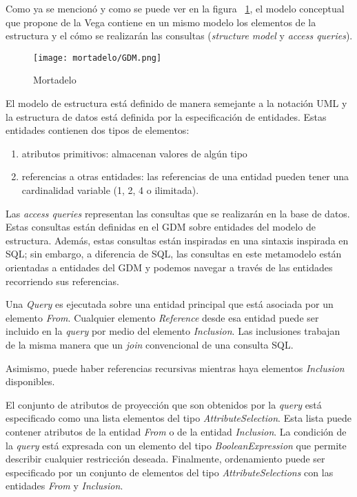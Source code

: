 Como ya se mencionó y como se puede ver en la figura ~\ref{img:mortadelo-gdm}, el modelo conceptual que propone de la Vega contiene en un mismo modelo los elementos de la estructura y el cómo se realizarán las consultas (\textit{structure model} y \textit{access queries}).


\begin{figure}[h!t] 
    \centering
    \texttt{[image: mortadelo/GDM.png]}
    \caption{Mortadelo}
    \label{img:mortadelo-gdm}
\end{figure}

El modelo de estructura está definido de manera semejante a la notación UML y la estructura de datos está definida por la especificación de entidades. Estas entidades contienen dos tipos de elementos:

\begin{enumerate}
    \item atributos primitivos: almacenan valores de algún tipo
    \item referencias a otras entidades: las referencias de una entidad pueden tener una cardinalidad variable (1, 2, 4 o ilimitada).
\end{enumerate}

Las \textit{access queries} representan las consultas que se realizarán en la base de datos. Estas consultas están definidas en el GDM sobre entidades del modelo de estructura. Además, estas consultas están inspiradas en una sintaxis inspirada en SQL; sin embargo, a diferencia de SQL, las consultas en este metamodelo están orientadas a entidades del GDM y podemos navegar a través de las entidades recorriendo sus referencias.


Una \textit{Query} es ejecutada sobre una entidad principal que está asociada por un elemento \textit{From}. Cualquier elemento \textit{Reference} desde esa entidad puede ser incluido en la \textit{query} por medio del elemento \textit{Inclusion}. Las inclusiones trabajan de la misma manera que un \textit{join} convencional de una consulta SQL.


Asimismo, puede haber referencias recursivas mientras haya elementos \textit{Inclusion} disponibles.


El conjunto de atributos de proyección que son obtenidos por la \textit{query} está especificado como una lista elementos del tipo \textit{AttributeSelection}. Esta lista puede contener atributos de la entidad \textit{From} o de la entidad \textit{Inclusion}. La condición de la \textit{query} está expresada con un elemento del tipo \textit{BooleanExpression} que permite describir cualquier restricción deseada. Finalmente, ordenamiento puede ser especificado por un conjunto de elementos del tipo \textit{AttributeSelections} con las entidades \textit{From} y \textit{Inclusion}.


